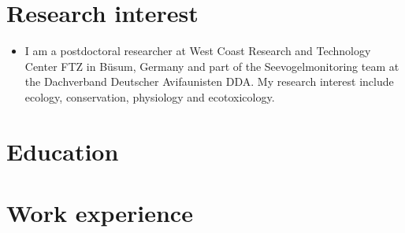 \documentclass[11pt,a4paper,]{awesome-cv}
\providecommand{\tightlist}{%
	\setlength{\itemsep}{0pt}\setlength{\parskip}{0pt}}
\begin{document}
\makecvheader






\hypertarget{research-interest}{%
\section{Research interest}\label{research-interest}}

\begin{itemize}
\tightlist
\item
  I am a postdoctoral researcher at West Coast Research and Technology
  Center FTZ in Büsum, Germany and part of the Seevogelmonitoring team
  at the Dachverband Deutscher Avifaunisten DDA. My research interest
  include ecology, conservation, physiology and ecotoxicology.
\end{itemize}

\hypertarget{education}{%
\section{Education}\label{education}}

\begin{cventries}
    \vspace{-4.0mm}
    \vspace{-4.0mm}
    \vspace{-4.0mm}
\end{cventries}

\hypertarget{work-experience}{%
\section{Work experience}\label{work-experience}}
\end{document}
